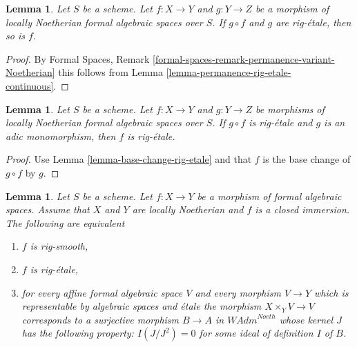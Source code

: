 \documentclass{stacks-project}
\theoremstyle{plain}
\newtheorem{lemma}[subsection]{Lemma}
\theoremstyle{definition}
\theoremstyle{remark}
\numberwithin{equation}{subsection}
\begin{document}
\begin{lemma}
\label{lemma-rig-etale-permanence}
Let $S$ be a scheme. Let $f : X \to Y$ and $g : Y \to Z$
be a morphism of locally Noetherian formal algebraic spaces over $S$.
If $g \circ f$ and $g$ are rig-\'etale, then so is $f$.
\end{lemma}

\begin{proof}
By Formal Spaces, Remark
\ref{formal-spaces-remark-permanence-variant-Noetherian}
this follows from Lemma \ref{lemma-permanence-rig-etale-continuous}.
\end{proof}

\begin{lemma}
\label{lemma-rig-etale-alternative-permanence}
Let $S$ be a scheme. Let $f : X \to Y$ and $g : Y \to Z$
be morphisms of locally Noetherian formal algebraic spaces over $S$.
If $g \circ f$ is rig-\'etale and $g$ is an adic monomorphism, then
$f$ is rig-\'etale.
\end{lemma}

\begin{proof}
Use Lemma \ref{lemma-base-change-rig-etale} and that
$f$ is the base change of $g \circ f$ by $g$.
\end{proof}

\begin{lemma}
\label{lemma-closed-immersion-rig-smooth}
Let $S$ be a scheme. Let $f : X \to Y$ be a morphism of formal algebraic
spaces. Assume that $X$ and $Y$ are locally Noetherian and $f$ is a
closed immersion. The following are equivalent
\begin{enumerate}
\item $f$ is rig-smooth,
\item $f$ is rig-\'etale,
\item for every affine formal algebraic space $V$ and every morphism
$V \to Y$ which is representable by algebraic spaces and \'etale
the morphism $X \times_Y V \to V$ corresponds to a surjective morphism
$B \to A$ in $\textit{WAdm}^{Noeth}$ whose kernel $J$ has the following
property: $I(J/J^2) = 0$ for some ideal of definition $I$ of $B$.
\end{enumerate}
\end{lemma}
\end{document}
